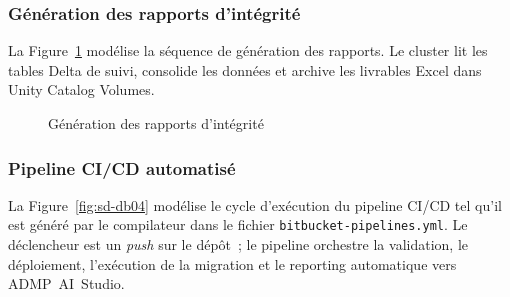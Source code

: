 \subsubsection*{Génération des rapports d'intégrité}

La Figure~\ref{fig:sd-db03} modélise la séquence de génération des rapports. Le cluster lit les tables Delta de suivi, consolide les données et archive les livrables Excel dans Unity Catalog Volumes.

\begin{figure}[H]
\centering
{}
\caption{Génération des rapports d'intégrité}
\label{fig:sd-db03}
\end{figure}

\subsubsection*{Pipeline CI/CD automatisé}

La Figure~\ref{fig:sd-db04} modélise le cycle d'exécution du pipeline CI/CD tel qu'il est généré par le compilateur dans le fichier \texttt{bitbucket-pipelines.yml}. Le déclencheur est un \textit{push} sur le dépôt~; le pipeline orchestre la validation, le déploiement, l'exécution de la migration et le reporting automatique vers ADMP~AI~Studio.

